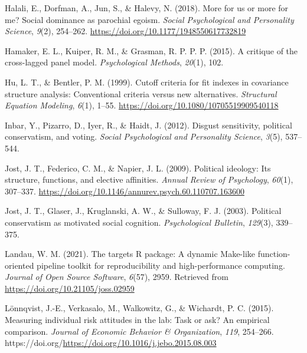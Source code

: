 \documentclass[
  man,floatsintext]{apa6}
\newlength{\cslhangindent}
\newlength{\cslentryspacingunit} %
\newenvironment{CSLReferences}[2] %
 {%
  \setlength{\parindent}{0pt}
  \ifodd #1
  \let\oldpar\par
  \def\par{\hangindent=\cslhangindent\oldpar}
  \fi
  \setlength{\parskip}{#2\cslentryspacingunit}
 }%
 {}
\begin{document}
\begin{CSLReferences}{1}{0}
\leavevmode{}%
Halali, E., Dorfman, A., Jun, S., \& Halevy, N. (2018). More for us or more for me? Social dominance as parochial egoism. \emph{Social Psychological and Personality Science}, \emph{9}(2), 254--262. \url{https://doi.org/10.1177/1948550617732819}

\leavevmode{}%
Hamaker, E. L., Kuiper, R. M., \& Grasman, R. P. P. P. (2015). A critique of the cross-lagged panel model. \emph{Psychological Methods}, \emph{20}(1), 102.

\leavevmode{}%
Hu, L. T., \& Bentler, P. M. (1999). Cutoff criteria for fit indexes in covariance structure analysis: Conventional criteria versus new alternatives. \emph{Structural Equation Modeling}, \emph{6}(1), 1--55. \url{https://doi.org/10.1080/10705519909540118}

\leavevmode{}%
Inbar, Y., Pizarro, D., Iyer, R., \& Haidt, J. (2012). Disgust sensitivity, political conservatism, and voting. \emph{Social Psychological and Personality Science}, \emph{3}(5), 537--544.

\leavevmode{}%
Jost, J. T., Federico, C. M., \& Napier, J. L. (2009). Political ideology: Its structure, functions, and elective affinities. \emph{Annual Review of Psychology}, \emph{60}(1), 307--337. \url{https://doi.org/10.1146/annurev.psych.60.110707.163600}

\leavevmode{}%
Jost, J. T., Glaser, J., Kruglanski, A. W., \& Sulloway, F. J. (2003). Political conservatism as motivated social cognition. \emph{Psychological Bulletin}, \emph{129}(3), 339--375.

\leavevmode{}%
Landau, W. M. (2021). The targets {R} package: A dynamic {M}ake-like function-oriented pipeline toolkit for reproducibility and high-performance computing. \emph{Journal of Open Source Software}, \emph{6}(57), 2959. Retrieved from \url{https://doi.org/10.21105/joss.02959}

\leavevmode{}%
Lönnqvist, J.-E., Verkasalo, M., Walkowitz, G., \& Wichardt, P. C. (2015). Measuring individual risk attitudes in the lab: Task or ask? An empirical comparison. \emph{Journal of Economic Behavior \& Organization}, \emph{119}, 254--266. https://doi.org/\url{https://doi.org/10.1016/j.jebo.2015.08.003}


\end{CSLReferences}
\end{document}
